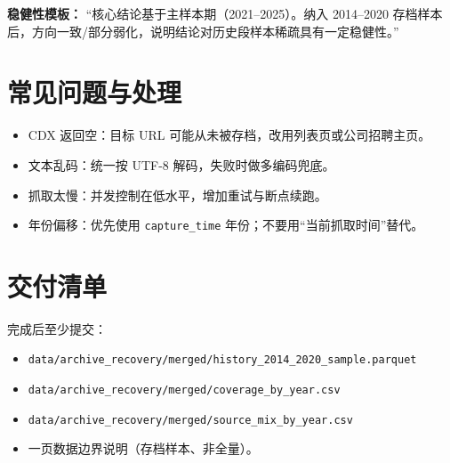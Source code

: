 \documentclass[12pt,a4paper]{ctexart}
\begin{document}
\textbf{稳健性模板：}
“核心结论基于主样本期（2021--2025）。纳入 2014--2020 存档样本后，方向一致/部分弱化，说明结论对历史段样本稀疏具有一定稳健性。”

\section{常见问题与处理}
\begin{itemize}
    \item CDX 返回空：目标 URL 可能从未被存档，改用列表页或公司招聘主页。
    \item 文本乱码：统一按 UTF-8 解码，失败时做多编码兜底。
    \item 抓取太慢：并发控制在低水平，增加重试与断点续跑。
    \item 年份偏移：优先使用 \texttt{capture\_time} 年份；不要用“当前抓取时间”替代。
\end{itemize}

\section{交付清单}
完成后至少提交：
\begin{itemize}
    \item \texttt{data/archive\_recovery/merged/history\_2014\_2020\_sample.parquet}
    \item \texttt{data/archive\_recovery/merged/coverage\_by\_year.csv}
    \item \texttt{data/archive\_recovery/merged/source\_mix\_by\_year.csv}
    \item 一页数据边界说明（存档样本、非全量）。
\end{itemize}
\end{document}
